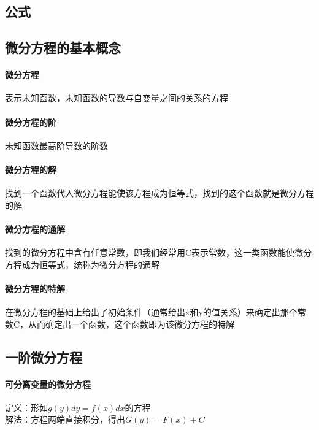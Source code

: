 \documentclass{article}
\begin{document}
\begin{flushleft}
	\LARGE
	
	\section{公式}
	
	\subsection{微分方程的基本概念}
	
	\paragraph{微分方程}
	表示未知函数，未知函数的导数与自变量之间的关系的方程\\
	\paragraph{微分方程的阶}
	未知函数最高阶导数的阶数\\
	\paragraph{微分方程的解}
	找到一个函数代入微分方程能使该方程成为恒等式，找到的这个函数就是微分方程的解\\
	\paragraph{微分方程的通解}
	找到的微分方程中含有任意常数，即我们经常用C表示常数，这一类函数能使微分方程成为恒等式，统称为微分方程的通解\\
	\paragraph{微分方程的特解}
	在微分方程的基础上给出了初始条件（通常给出x和y的值关系）来确定出那个常数C，从而确定出一个函数，这个函数即为该微分方程的特解\\
	
	\subsection{一阶微分方程}
	
	 \paragraph{可分离变量的微分方程}
	 定义：形如$g(y)dy=f(x)dx$的方程\\
	 解法：方程两端直接积分，得出$G(y)=F(x)+C$\\
	 

\end{flushleft}
\end{document}
